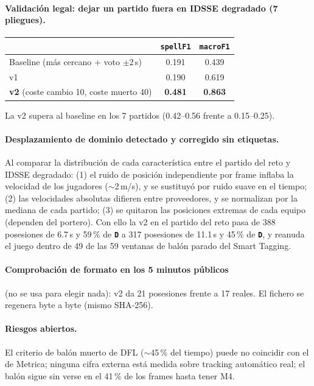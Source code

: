 \documentclass[11pt,a4paper]{article}
\newcommand{\lab}[1]{\texttt{\textbf{#1}}}
\begin{document}
\paragraph{Validaci\'on legal: dejar un partido fuera en IDSSE degradado (7 pliegues).}
\begin{center}
\begin{tabular}{lcc}
\toprule
 & \texttt{spellF1} & \texttt{macroF1} \\
\midrule
Baseline (m\'as cercano + voto $\pm$2\,s) & 0.191 & 0.439 \\
v1 & 0.190 & 0.619 \\
\textbf{v2} (coste cambio 10, coste muerto 40) & \textbf{0.481} & \textbf{0.863} \\
\bottomrule
\end{tabular}
\end{center}
La v2 supera al baseline en los 7 partidos (0.42--0.56 frente a 0.15--0.25).

\paragraph{Desplazamiento de dominio detectado y corregido sin etiquetas.} Al comparar la
distribuci\'on de cada caracter\'istica entre el partido del reto y IDSSE degradado: (1) el ruido de
posici\'on independiente por frame inflaba la velocidad de los jugadores ($\sim$2\,m/s), y se
sustituy\'o por ruido suave en el tiempo; (2) las velocidades absolutas difieren entre
proveedores, y se normalizan por la mediana de cada partido; (3) se quitaron las posiciones
extremas de cada equipo (dependen del portero). Con ello la v2 en el partido del reto pasa de
388 posesiones de 6.7\,s y 59\,\% de \lab{D} a 317 posesiones de 11.1\,s y 45\,\% de \lab{D},
y reanuda el juego dentro de 49 de las 59 ventanas de bal\'on parado del Smart Tagging.

\paragraph{Comprobaci\'on de formato en los 5 minutos p\'ublicos} (no se usa para elegir nada):
v2 da 21 posesiones frente a 17 reales. El fichero se regenera byte a byte (mismo SHA-256).

\paragraph{Riesgos abiertos.} El criterio de bal\'on muerto de DFL ($\sim$45\,\% del tiempo)
puede no coincidir con el de Metrica; ninguna cifra externa est\'a medida sobre tracking autom\'atico
real; el bal\'on sigue sin verse en el 41\,\% de los frames hasta tener M4.
\end{document}
